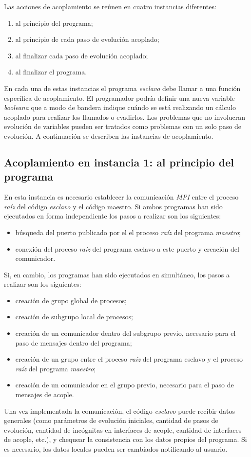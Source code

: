Las acciones de acoplamiento se reúnen en cuatro instancias diferentes:
\begin{enumerate}
\item al principio del programa;
\item al principio de cada paso de evolución acoplado;
\item al finalizar cada paso de evolución acoplado;
\item al finalizar el programa.
\end{enumerate}
En cada una de estas instancias el programa \textit{esclavo} debe llamar a una función específica de acoplamiento.
El programador podría definir una nueva variable \textit{booleana} que a modo de bandera indique cuándo se está realizando un cálculo acoplado para realizar los llamados o evadirlos.
Los problemas que no involucran evolución de variables pueden ser tratados como problemas con un solo paso de evolución.
A continuación se describen las instancias de acoplamiento.

\subsection*{Acoplamiento en instancia 1: al principio del programa}

En esta instancia es necesario establecer la comunicación \textit{MPI} entre el proceso \textit{raíz} del código \textit{esclavo} y el código maestro.
Si ambos programas han sido ejecutados en forma independiente los pasos a realizar son los siguientes:
\begin{itemize}
\item búsqueda del puerto publicado por el el proceso \textit{raíz} del programa \textit{maestro};
\item conexión del proceso \textit{raíz} del programa esclavo a este puerto y creación del comunicador.
\end{itemize}
Si, en cambio, los programas han sido ejecutados en simultáneo, los pasos a realizar son los siguientes:
\begin{itemize}
\item creación de grupo global de procesos;
\item creación de subgrupo local de procesos;
\item creación de un comunicador dentro del subgrupo previo, necesario para el paso de mensajes dentro del programa;
\item creación de un grupo entre el proceso \textit{raíz} del programa esclavo y el proceso \textit{raíz} del programa \textit{maestro};
\item creación de un comunicador en el grupo previo, necesario para el paso de mensajes de acople.
\end{itemize}
Una vez implementada la comunicación, el código \textit{esclavo} puede recibir datos generales 
(como parámetros de evolución iniciales, cantidad de pasos de evolución, cantidad de incógnitas en interfaces de acople, cantidad de interfaces de acople, etc.),
y chequear la consistencia con los datos propios del programa.
Si es necesario, los datos locales pueden ser cambiados notificando al usuario.

